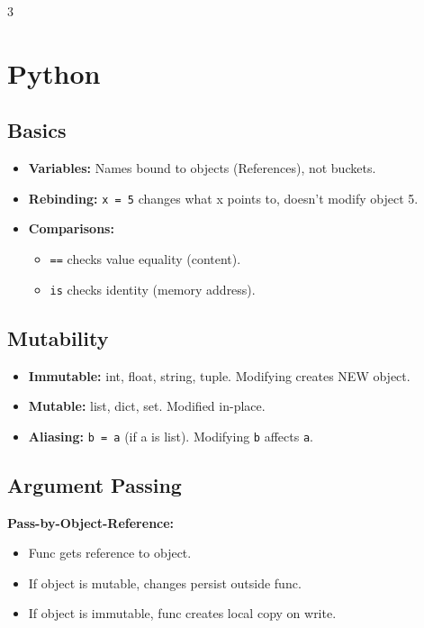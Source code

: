 \documentclass[10pt, landscape, a4paper]{article}
\begin{document}
\begin{multicols*}{3}
  \section{Python}
  \subsection{Basics}
  \begin{itemize}
    \item \textbf{Variables:} Names bound to objects (References), not buckets.
    \item \textbf{Rebinding:} \texttt{x = 5} changes what x points
      to, doesn't modify object 5.
    \item \textbf{Comparisons:}
      \begin{itemize}
        \item \texttt{==} checks value equality (content).
        \item \texttt{is} checks identity (memory address).
      \end{itemize}
  \end{itemize}

  \subsection{Mutability}
  \begin{itemize}
    \item \textbf{Immutable:} int, float, string, tuple. Modifying
      creates NEW object.
    \item \textbf{Mutable:} list, dict, set. Modified in-place.
    \item \textbf{Aliasing:} \texttt{b = a} (if a is list). Modifying
      \texttt{b} affects \texttt{a}.
  \end{itemize}

  \subsection{Argument Passing}
  \textbf{Pass-by-Object-Reference:}
  \begin{itemize}
    \item Func gets reference to object.
    \item If object is mutable, changes persist outside func.
    \item If object is immutable, func creates local copy on write.
  \end{itemize}


\end{multicols*}
\end{document}
